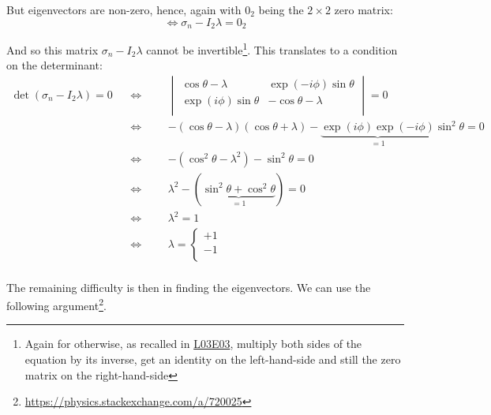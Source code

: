 \documentclass[solutions.tex]{subfiles}
\begin{document}
But eigenvectors are non-zero, hence, again with $0_2$ being the $2\times2$
zero matrix:
\[
	\Leftrightarrow \sigma_n - I_2\lambda = 0_2
\]

And so this matrix $\sigma_n - I_2\lambda$ cannot be invertible\footnote{
Again for otherwise, as recalled in
\href{https://github.com/mbivert/ttm/blob/master/qm/L03E03.pdf}{L03E03},
multiply both sides of the equation by its inverse, get an identity on
the left-hand-side and still the zero matrix on the right-hand-side}. This
translates to a condition on the determinant:
\begin{equation*}\begin{aligned}
	\det(\sigma_n - I_2\lambda) = 0
	&&\Leftrightarrow&&&
	\begin{vmatrix}
		\cos\theta-\lambda & \exp(-i\phi)\sin\theta \\
		\exp(i\phi)\sin\theta & -\cos\theta-\lambda \\
	\end{vmatrix} = 0 \\
	~ &&\Leftrightarrow&&&
		-(\cos\theta-\lambda)(\cos\theta+\lambda)
			-\underbrace{\exp(i\phi)\exp(-i\phi)}_{=1}\sin^2\theta = 0 \\
	~ &&\Leftrightarrow&&&
		-(\cos^2\theta-\lambda^2)-\sin^2\theta = 0 \\
	~ &&\Leftrightarrow&&&
		\lambda^2-(\underbrace{\sin^2\theta+\cos^2\theta}_{=1}) = 0\\
	~ &&\Leftrightarrow&&&
		\lambda^2 = 1 \\
	~ &&\Leftrightarrow&&&
		\boxed{\lambda = \begin{cases}
			+1 \\
			-1 \\
		\end{cases}} \\
\end{aligned}\end{equation*}

The remaining difficulty is then in finding the eigenvectors. We can
use the following argument\footnote{\url{https://physics.stackexchange.com/a/720025}}. \\
\end{document}
